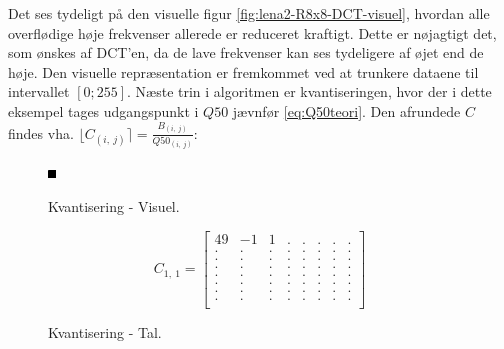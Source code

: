Det ses tydeligt på den visuelle figur \ref{fig:lena2-R8x8-DCT-visuel}, hvordan alle overflødige høje frekvenser allerede er reduceret kraftigt. Dette er nøjagtigt det, som ønskes af DCT'en, da de lave frekvenser kan ses tydeligere af øjet end de høje. Den visuelle repræsentation er fremkommet ved at trunkere dataene til intervallet $[0;255]$. Næste trin i algoritmen er kvantiseringen, hvor der i dette eksempel tages udgangspunkt i $Q50$ jævnfør \vref{eq:Q50teori}. Den afrundede $C$ findes vha. $\lfloor C_{(i,\ j)} \rceil = \frac{B_{(i,\ j)}}{Q50_{(i,\ j)}}$:

\begin{figure}[!h]
\begin{minipage}[b]{0.25\linewidth}
\centering
\includegraphics[width=\textwidth]{Billeder/LenaAnvendelse/RED8x8/lena3-R8x8-quantization.png}
\caption{Kvantisering - Visuel.}
\label{fig:lena3-R8x8-quantization-visuel}
\end{minipage}
\hspace{0.5cm}
\begin{minipage}[b]{0.40\linewidth}
\centering
\[C_{1,\ 1}=\begin{bmatrix}
49 & -1 & 1 & . & . & . & . & . \\
.  & .  & . & . & . & . & . & . \\
.  & .  & . & . & . & . & . & . \\
.  & .  & . & . & . & . & . & . \\
.  & .  & . & . & . & . & . & . \\
.  & .  & . & . & . & . & . & . \\
.  & .  & . & . & . & . & . & . \\
.  & .  & . & . & . & . & . & . \\
\end{bmatrix}\]
\caption{Kvantisering - Tal.}
\label{fig:lena3-R8x8-quantization-matrix}
\end{minipage}
\end{figure}

